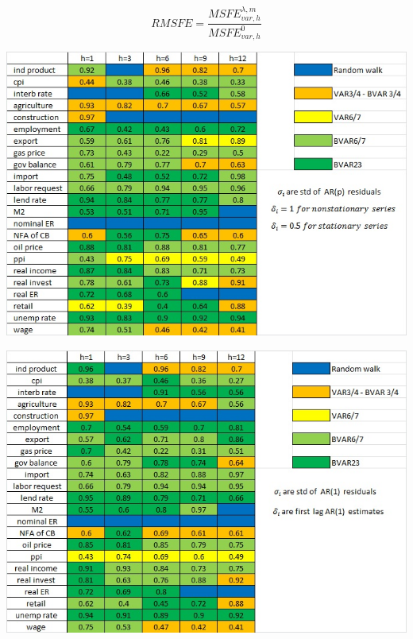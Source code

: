 \documentclass[a0, landscape]{a0poster}
\begin{document}
\begin{multicols}{3}
\begin{equation*}
RMSFE=\frac{MSFE_{var,h}^{\lambda,m}}{MSFE_{var,h}^0}
\end{equation*}
\begin{center}
\includegraphics[scale=1.5]{hyper3}
\end{center}
\begin{center}
\includegraphics[scale=1.5]{hyper4}
\end{center}




\end{multicols}
\end{document}
